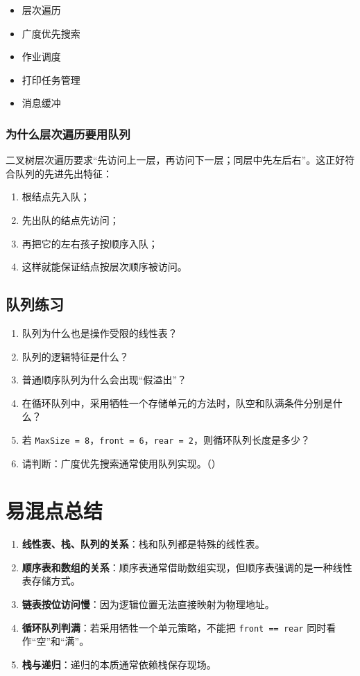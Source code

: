 \documentclass{../../note}
\begin{document}
\begin{itemize}
  \item 层次遍历
  \item 广度优先搜索
  \item 作业调度
  \item 打印任务管理
  \item 消息缓冲
\end{itemize}

\subsubsection{为什么层次遍历要用队列}

二叉树层次遍历要求“先访问上一层，再访问下一层；同层中先左后右”。这正好符合队列的先进先出特征：

\begin{enumerate}
  \item 根结点先入队；
  \item 先出队的结点先访问；
  \item 再把它的左右孩子按顺序入队；
  \item 这样就能保证结点按层次顺序被访问。
\end{enumerate}

\subsection{队列练习}

\begin{enumerate}
  \item 队列为什么也是操作受限的线性表？
  \item 队列的逻辑特征是什么？
  \item 普通顺序队列为什么会出现“假溢出”？
  \item 在循环队列中，采用牺牲一个存储单元的方法时，队空和队满条件分别是什么？
  \item 若 \texttt{MaxSize = 8}，\texttt{front = 6}，\texttt{rear = 2}，则循环队列长度是多少？
  \item 请判断：广度优先搜索通常使用队列实现。（\hspace{1cm}）
\end{enumerate}

\section{易混点总结}

\begin{enumerate}
  \item \textbf{线性表、栈、队列的关系}：栈和队列都是特殊的线性表。
  \item \textbf{顺序表和数组的关系}：顺序表通常借助数组实现，但顺序表强调的是一种线性表存储方式。
  \item \textbf{链表按位访问慢}：因为逻辑位置无法直接映射为物理地址。
  \item \textbf{循环队列判满}：若采用牺牲一个单元策略，不能把 \texttt{front == rear} 同时看作“空”和“满”。
  \item \textbf{栈与递归}：递归的本质通常依赖栈保存现场。
\end{enumerate}
\end{document}
